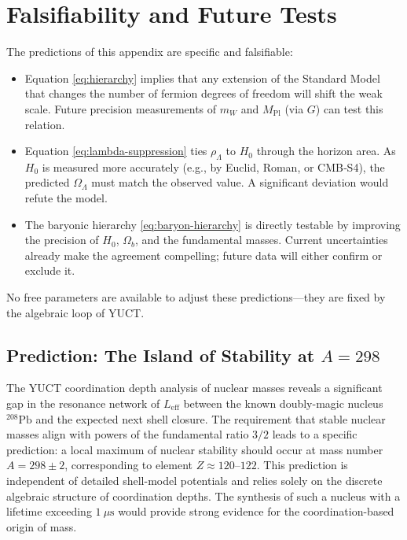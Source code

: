 \documentclass[12pt,a4paper]{article}
\begin{document}

	\section{Falsifiability and Future Tests}
	
	The predictions of this appendix are specific and falsifiable:
	\begin{itemize}
		\item Equation \eqref{eq:hierarchy} implies that any extension of the Standard Model that changes the number of fermion degrees of freedom will shift the weak scale. Future precision measurements of $m_W$ and $M_{\mathrm{Pl}}$ (via $G$) can test this relation.
		\item Equation \eqref{eq:lambda-suppression} ties $\rho_\Lambda$ to $H_0$ through the horizon area. As $H_0$ is measured more accurately (e.g., by Euclid, Roman, or CMB‑S4), the predicted $\Omega_\Lambda$ must match the observed value. A significant deviation would refute the model.
		\item The baryonic hierarchy \eqref{eq:baryon-hierarchy} is directly testable by improving the precision of $H_0$, $\Omega_b$, and the fundamental masses. Current uncertainties already make the agreement compelling; future data will either confirm or exclude it.
	\end{itemize}
	No free parameters are available to adjust these predictions—they are fixed by the algebraic loop of YUCT.
	
	\subsection{Prediction: The Island of Stability at $A=298$}
	
	The YUCT coordination depth analysis of nuclear masses reveals a significant gap in the resonance network of $L_{\mathrm{eff}}$ between the known doubly-magic nucleus $^{208}\mathrm{Pb}$ and the expected next shell closure. The requirement that stable nuclear masses align with powers of the fundamental ratio $3/2$ leads to a specific prediction: a local maximum of nuclear stability should occur at mass number $A = 298 \pm 2$, corresponding to element $Z \approx 120$--$122$. This prediction is independent of detailed shell-model potentials and relies solely on the discrete algebraic structure of coordination depths. The synthesis of such a nucleus with a lifetime exceeding $1\ \mu\text{s}$ would provide strong evidence for the coordination-based origin of mass.
	
\end{document}
